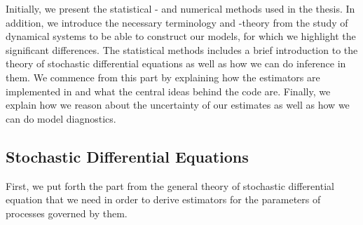 Initially, we present the statistical - and numerical methods used in the thesis. In addition, we introduce the necessary terminology and -theory from the study of dynamical systems to be able to construct our models, for which we highlight the significant differences. The statistical methods includes a brief introduction to the theory of stochastic differential equations as well as how we can do inference in them. We commence from this part by explaining how the estimators are implemented in  and what the central ideas behind the code are. Finally, we explain how we reason about the uncertainty of our estimates as well as how we can do model diagnostics.
\subsection{Stochastic Differential Equations}
First, we put forth the part from the general theory of stochastic differential equation that we need in order to derive estimators for the parameters of processes governed by them. 
